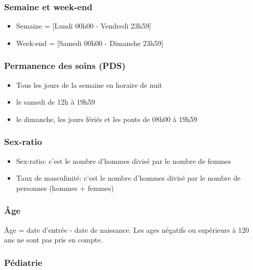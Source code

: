 \documentclass[]{article}
\begin{document}
\subsubsection{Semaine et week-end}\label{semaine-et-week-end}

\begin{itemize}
\itemsep1pt\parskip0pt
\item
  Semaine = {[}Lundi 00h00 - Vendredi 23h59{]}
\item
  Week-end = {[}Samedi 00h00 - Dimanche 23h59{]}
\end{itemize}

\subsubsection{Permanence des soins
(PDS)}\label{permanence-des-soins-pds}

\begin{itemize}
\itemsep1pt\parskip0pt
\item
  Tous les jours de la semaine en horaire de nuit
\item
  le samedi de 12h à 19h59
\item
  le dimanche, les jours fériés et les ponts de 08h00 à 19h59
\end{itemize}

\subsubsection{Sex-ratio}\label{sex-ratio}

\begin{itemize}
\itemsep1pt\parskip0pt
\item
  Sex-ratio: c'est le nombre d'hommes divisé par le nombre de femmes
\item
  Taux de masculinité: c'est le nombre d'hommes divisé par le nombre de
  personnes (hommes + femmes)
\end{itemize}

\subsubsection{Âge}\label{age}

Âge = date d'entrée - date de naissance. Les ages négatifs ou supérieurs
à 120 ans ne sont pas pris en compte.

\subsubsection{Pédiatrie}\label{pediatrie}
\end{document}
